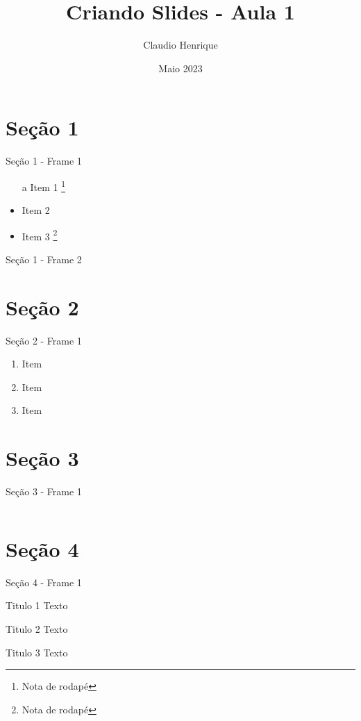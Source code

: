 \documentclass[aspectratio=149]{beamer}
\title{Criando Slides - Aula 1}
\author{Claudio Henrique}
\date{Maio 2023}
\begin{document}
\maketitle

\begin{frame}
	\tableofcontents %
\end{frame}

\section{Seção 1}
	\begin{frame}{Seção 1 - Frame 1}
		\begin{itemize}
			\item[a] Item 1 \footnote{Nota de rodapé}
			\item Item 2
			\item Item 3 \footnote[9]{Nota de rodapé}
		\end{itemize}
	\end{frame}
	
	\begin{frame}{Seção 1 - Frame 2}
		\lipsum[1-1]
	\end{frame}

\section{Seção 2}

	\begin{frame}{Seção 2 - Frame 1}
		\begin{enumerate} [<+- | alert@+>] %
			\item Item
			\item Item
			\item Item
		\end{enumerate}
	\end{frame}
	
\section{Seção 3}
	\begin{frame}{Seção 3 - Frame 1}
		\begin{columns}
			\lipsum[1-1]
			
			\lipsum[1-1]
		\end{columns}
	\end{frame}
	
\section{Seção 4}
	\begin{frame}{Seção 4 - Frame 1}
		\begin{block}{Titulo 1}
			Texto
		\end{block}
		
		\begin{alertblock}{Titulo 2}
			Texto
		\end{alertblock}
		
		\begin{exampleblock}{Titulo 3}
			Texto
		\end{exampleblock}
	\end{frame}
\end{document}
